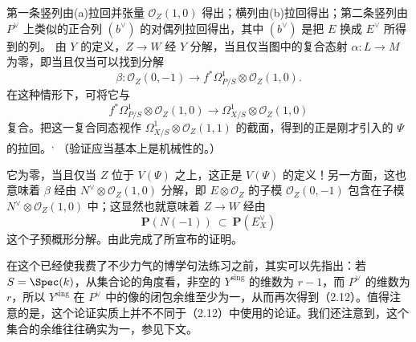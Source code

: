 第一条竖列由(a)拉回并张量 $\mathcal O_Z(1,0)$ 得出；横列由(b)拉回得出；第二条竖列由 $P^\vee$ 上类似的正合列 $(b^\vee)$ 的对偶列拉回得出，其中 $(b^\vee)$ 是把 $E$ 换成 $E^\vee$ 所得到的列。
由 $Y$ 的定义，$Z\to W$ 经 $Y$ 分解，当且仅当图中的复合态射 $\alpha:L\to M$ 为零，即当且仅当可以找到分解
\[
\beta:\mathcal O_Z(0,-1)\longrightarrow
f^*\Omega^1_{P/S}\otimes\mathcal O_Z(1,0).
\]
在这种情形下，可将它与
\[
f^*\Omega^1_{P/S}\otimes\mathcal O_Z(1,0)
\longrightarrow\Omega^1_{X/S}\otimes\mathcal O_Z(1,0)
\]
复合。把这一复合同态视作 $\Omega^1_{X/S}\otimes\mathcal O_Z(1,1)$ 的截面，得到的正是刚才引入的 $\Psi$ 的拉回。\textsuperscript{,}
（验证应当基本上是机械性的。）

它为零，当且仅当 $Z$ 位于 $V(\Psi)$ 之上，这正是 $V(\Psi)$ 的定义！另一方面，这也意味着 $\beta$ 经由 $N^\vee\otimes\mathcal O_Z(1,0)$ 分解，即 $E\otimes\mathcal O_Z$ 的子模 $\mathcal O_Z(0,-1)$ 包含在子模 $N^\vee\otimes\mathcal O_Z(1,0)$ 中；这显然也就意味着 $Z\to W$ 经由
\[
\mathbf P(N(-1))\ \subset\ \mathbf P(E_X^\vee)
\]
这个子预概形分解。由此完成了所宣布的证明。

在这个已经使我费了不少力气的博学句法练习之前，其实可以先指出：若 $S=\Spec(k)$，从集合论的角度看，非空的 $Y^{\mathrm{sing}}$ 的维数为 $r-1$，而 $P^\vee$ 的维数为 $r$，所以 $Y^{\mathrm{sing}}$ 在 $P^\vee$ 中的像的闭包余维至少为一，从而再次得到（2.12）。值得注意的是，这个论证实质上并不不同于（2.12）中使用的论证。我们还注意到，这个集合的余维往往确实为一，参见下文。

